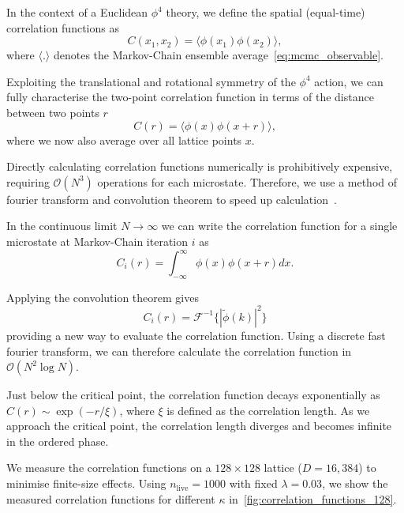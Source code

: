\documentclass[11pt]{article}
\begin{document}
    In the context of a Euclidean $\phi^4$ theory, we define the spatial (equal-time) correlation functions as
    \begin{equation}\label{eq:full_correlation_function}
    C(x_1, x_2) = \langle \phi(x_1) \phi(x_2) \rangle,
    \end{equation}
    where $\langle . \rangle$ denotes the Markov-Chain ensemble average~\eqref{eq:mcmc_observable}.

    Exploiting the translational and rotational symmetry of the $\phi^4$ action, we can fully characterise the two-point
    correlation function in terms of the distance between two points $r$
    \begin{equation}\label{eq:correlation_function}
    C(r) = \langle \phi(x) \phi(x + r) \rangle,
    \end{equation}
    where we now also average over all lattice points $x$.

    Directly calculating correlation functions numerically is prohibitively expensive, requiring $\mathcal{O}(N^3)$
    operations for each microstate.
    Therefore, we use a method of fourier transform and convolution theorem to speed up
    calculation~\cite{Ruge_1994}.

    In the continuous limit $N \rightarrow \infty$ we can write the correlation function for a single microstate at
    Markov-Chain iteration $i$ as
    \begin{equation}\label{eq:continuous_correlation}
        C_{i}(r) = \int_{-\infty}^{\infty} \phi(x) \phi(x + r) dx.
    \end{equation}

    Applying the convolution theorem gives
    \begin{equation}\label{eq:convolution_theorem}
        C_{i}(r) = \mathcal{F}^{-1} \{ |\tilde{\phi}(k)|^2 \}
    \end{equation}
    providing a new way to evaluate the correlation function.
    Using a discrete fast fourier transform, we can therefore calculate the correlation function in
    $\mathcal{O}(N^2 \log N)$.

    Just below the critical point, the correlation function decays exponentially as $C(r) \sim \exp(-r / \xi)$,
    where $\xi$ is defined as the correlation length.
    As we approach the critical point, the correlation length diverges and becomes infinite in the ordered phase.

    We measure the correlation functions on a $128 \times 128$ lattice ($D=16,384$) to minimise finite-size effects.
    Using $n_{\text{live}}=1000$ with fixed $\lambda=0.03$, we show the measured correlation functions for different $\kappa$
    in~\cref{fig:correlation_functions_128}.
\end{document}

